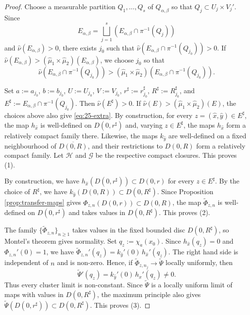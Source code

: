 \documentclass[11pt]{amsart}
\numberwithin{equation}{section}
\theoremstyle{plain}
\theoremstyle{definition}
\theoremstyle{remark}
\begin{document}
\begin{proof}
\smallskip

Choose a measurable partition
$Q_1,\ldots,Q_s$ of $Q_{\alpha,\beta}$ 
so that 
$Q_j\subset U_j\times V_j'$. 
Since
$$
E_{\alpha,\beta}
=
\bigsqcup_{j=1}^s
\left(E_{\alpha,\beta}\cap\pi^{-1}(Q_j)\right)
$$
and $\hat\nu(E_{\alpha,\beta})>0$, there exists $j_0$ such that
$
\hat\nu
\left(E_{\alpha,\beta}\cap\pi^{-1}(Q_{j_0})\right)>0$.
If
$\hat\nu(E_{\alpha,\beta})>
(\hat\mu_1\times\hat\mu_2)(E_{\alpha,\beta})$,
we choose $j_0$ so that
$$
\hat\nu
\left(E_{\alpha,\beta}\cap\pi^{-1}(Q_{j_0})\right)
>
(\hat\mu_1\times\hat\mu_2)
\left(E_{\alpha,\beta}\cap\pi^{-1}(Q_{j_0})\right).
$$

Set
$
a:=a_{j_0}$,
$b:=b_{j_0}$,
$U:=U_{j_0}$,
$V:=V_{j_0}$,
$r^\sharp:=r_{j_0}^\sharp$,
$R^\sharp:=R_{j_0}^\sharp$,
and
$E^\sharp
:=
E_{\alpha,\beta}\cap\pi^{-1}(Q_{j_0})$.
Then $\hat\nu(E^\sharp)>0$. If
$\hat\nu(E)>
(\hat\mu_1\times\hat\mu_2)(E)$, the
choices above also give \eqref{eq:25-extra}.
By construction,
for every $z=(\hat x,\hat y)\in E^\sharp$,
the map $h_{\hat x}$ is well-defined on
$D(0,r^\sharp)$ and, varying $z\in  E^\sharp$,
the maps $h_{\hat x}$
form a relatively compact family there.
Likewise, the maps $k_{\hat y}$ are well-defined on a fixed neighbourhood
of $\overline{D(0,R)}$, and their restrictions to $D(0,R)$ form a
relatively compact family. Let $\mathcal H$ and $\mathcal G$ be the
respective compact closures. This proves (1).

By construction, we have
$
h_{\hat x}(D(0,r^\sharp))\subset D(0,r)
$
for every $z\in E^\sharp$.
By the choice of $R^\sharp$, we have
$k_{\hat y}(D(0,R))
\subset D(0,R^\sharp)$.
Since Proposition \ref{prop:transfer-maps} gives
$\Phi_{z,n}(D(0,r))\subset D(0,R)$, the map $\widetilde\Phi_{z,n}$
is well-defined on $D(0,r^\sharp)$ and takes values in
$D(0,R^\sharp)$. This proves (2).

The family
$\{\widetilde\Phi_{z,n}\}_{n\geq1}$ takes values in the fixed bounded
disc $D(0,R^\sharp)$, so Montel's theorem gives normality. Set
$q_z:=\chi_a
(x_0)$. Since
$h_{\hat x}(q_z)=0$ and
$\Phi_{z,n}'(0)=1$, we have
$\widetilde\Phi_{z,n}'(q_z)
=
k_{\hat y}'(0)\,
h_{\hat x}'(q_z)$.
The right hand side is independent of $n$ and is non-zero. Hence, if
$\widetilde\Phi_{z,n_j}\to\widetilde\Psi$ locally uniformly, then
\begin{equation}\label{eq:derivative-tilde-psi}
\widetilde\Psi'(q_z)
=
k_{\hat y}'(0)\,
h_{\hat x}'(q_z)
\neq0.
\end{equation}
Thus every cluster limit is non-constant.
Since $\widetilde\Psi$ is a locally uniform limit of maps with
values in $D(0,R^\sharp)$, the maximum principle also gives
$\widetilde\Psi(D(0,r^\sharp))\subset D(0,R^\sharp)$.
This proves (3).


\end{proof}
\end{document}
